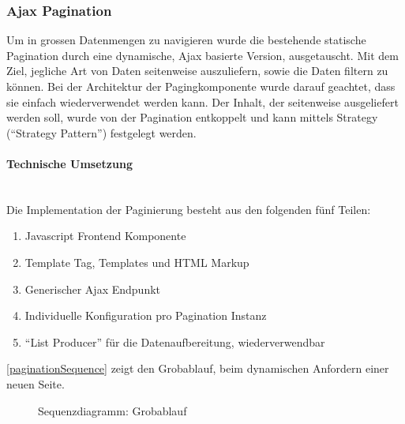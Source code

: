 \subsubsection{Ajax Pagination} Um in grossen Datenmengen zu navigieren wurde
die bestehende statische Pagination durch eine dynamische, Ajax basierte
Version, ausgetauscht. Mit dem Ziel, jegliche Art von Daten seitenweise auszuliefern, sowie die Daten filtern zu können. 
Bei der Architektur der Pagingkomponente wurde darauf geachtet, dass sie einfach wiederverwendet werden kann. Der Inhalt, der seitenweise ausgeliefert werden soll, wurde von der Pagination entkoppelt und kann mittels Strategy (\enquote{Strategy Pattern}\cite{gamma1994design}) festgelegt werden.

\paragraph{Technische Umsetzung} \hspace{0pt} \\
Die Implementation der Paginierung besteht aus den folgenden fünf Teilen:
\begin{enumerate}
	\item Javascript Frontend Komponente
	\item Template Tag, Templates und HTML Markup
	\item Generischer Ajax Endpunkt
	\item Individuelle Konfiguration pro Pagination Instanz
	\item \enquote{List Producer} für die Datenaufbereitung, wiederverwendbar
\end{enumerate}

\autoref{paginationSequence} zeigt den Grobablauf, beim dynamischen Anfordern einer
neuen Seite.

\begin{figure}[H]	
	\centering
	
	\caption{Sequenzdiagramm: Grobablauf}
	\label{paginationSequence}
\end{figure}


